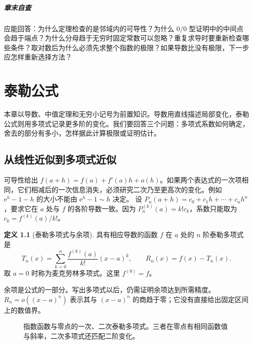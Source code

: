 \documentclass[UTF8,fontset=fandol,12pt,oneside,openany]{ctexrep}
\newcommand{\ee}{\mathrm e}
\theoremstyle{definition}
\newtheorem{definition}[theorem]{定义}
\begin{document}
\paragraph{章末自查}
应能回答：为什么定理检查的是邻域内的可导性？为什么 $0/0$ 型证明中的中间点会趋于端点？为什么分母趋于无穷时固定常数可以忽略？重复求导时要重新检查哪些条件？取对数后为什么必须先求整个指数的极限？如果导数比没有极限，下一步应怎样重新选择方法？


\chapter{泰勒公式}
\label{lec:08:chapter}
本章以导数、中值定理和无穷小记号为前置知识。导数用直线描述局部变化，泰勒公式则用多项式记录更多阶的变化。我们要回答三个问题：多项式系数如何确定，舍去的部分有多小，怎样据此计算极限或证明估计。

\section{从线性近似到多项式近似}
可导性给出 $f(a+h)=f(a)+f'(a)h+o(h)$。如果两个表达式的一次项相同，它们相减后的一次信息消失，必须研究二次乃至更高次的变化。例如 $\ee^h-1-h$ 的大小不能由 $\ee^h-1\sim h$ 决定。
设 $P_n(a+h)=c_0+c_1h+\cdots+c_nh^n$，要求它在 $a$ 处与 $f$ 的各阶导数一致。因为 $P_n^{(k)}(a)=k!c_k$，系数只能取为 $c_k=f^{(k)}(a)/k!$。
\begin{definition}[泰勒多项式与余项]
具有相应导数的函数 $f$ 在 $a$ 处的 $n$ 阶泰勒多项式是
\[
T_n(x)=\sum_{k=0}^n\frac{f^{(k)}(a)}{k!}(x-a)^k,
\qquad R_n(x)=f(x)-T_n(x).
\]
取 $a=0$ 时称为麦克劳林多项式。这里 $f^{(0)}=f$。
\end{definition}
余项是公式的一部分。写出多项式以后，仍需证明余项达到所需精度。$R_n=o((x-a)^n)$ 表示其与 $(x-a)^n$ 的商趋于零；它没有直接给出固定区间上的数值界。
\begin{figure}[htbp]
\centering
{}
\caption{指数函数与零点的一次、二次泰勒多项式。三者在零点有相同函数值与斜率，二次多项式还匹配二阶变化。}
\label{lec:08:fig-approx}
\end{figure}
\end{document}
